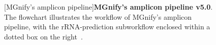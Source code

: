 \begin{figure}[H]
  \centering
  [MGnify's amplicon pipeline]{\textbf{MGnify's amplicon pipeline v5.0}. The flowchart illustrates the workflow of MGnify's amplicon pipeline, with the rRNA-prediction subworkflow enclosed within a dotted box on the right~\cite{noauthor_mgnify_nodate-25}.} \label{fig:amplicon-pipline}%
\end{figure}